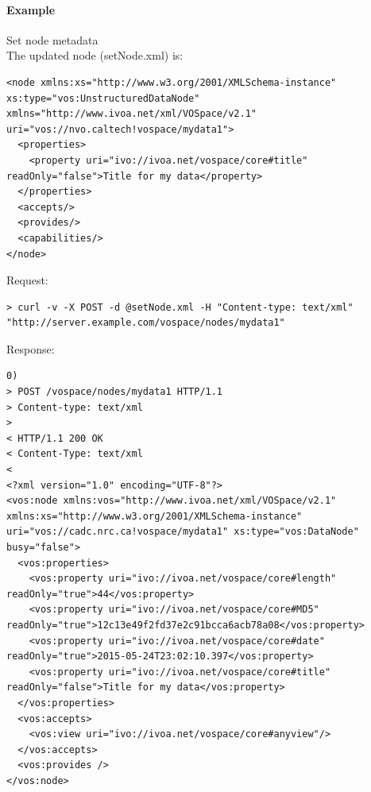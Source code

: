 \documentclass[11pt,a4paper]{ivoa}
\begin{document}
\paragraph{Example}
Set node metadata
\\[5px]
\noindent
The updated node (setNode.xml) is:
\begin{lstlisting}
<node xmlns:xs="http://www.w3.org/2001/XMLSchema-instance" xs:type="vos:UnstructuredDataNode" xmlns="http://www.ivoa.net/xml/VOSpace/v2.1" uri="vos://nvo.caltech!vospace/mydata1">
  <properties>
    <property uri="ivo://ivoa.net/vospace/core#title" readOnly="false">Title for my data</property>
  </properties>
  <accepts/>
  <provides/>
  <capabilities/>
</node>
\end{lstlisting}
Request:
\begin{lstlisting}
> curl -v -X POST -d @setNode.xml -H "Content-type: text/xml" "http://server.example.com/vospace/nodes/mydata1"
\end{lstlisting}
Response:
\begin{lstlisting}0)
> POST /vospace/nodes/mydata1 HTTP/1.1
> Content-type: text/xml
>
< HTTP/1.1 200 OK
< Content-Type: text/xml
<
<?xml version="1.0" encoding="UTF-8"?>
<vos:node xmlns:vos="http://www.ivoa.net/xml/VOSpace/v2.1" xmlns:xs="http://www.w3.org/2001/XMLSchema-instance" uri="vos://cadc.nrc.ca!vospace/mydata1" xs:type="vos:DataNode" busy="false">
  <vos:properties>
    <vos:property uri="ivo://ivoa.net/vospace/core#length" readOnly="true">44</vos:property>
    <vos:property uri="ivo://ivoa.net/vospace/core#MD5" readOnly="true">12c13e49f2fd37e2c91bcca6acb78a08</vos:property>
    <vos:property uri="ivo://ivoa.net/vospace/core#date" readOnly="true">2015-05-24T23:02:10.397</vos:property>
    <vos:property uri="ivo://ivoa.net/vospace/core#title" readOnly="false">Title for my data</vos:property>
  </vos:properties>
  <vos:accepts>
    <vos:view uri="ivo://ivoa.net/vospace/core#anyview"/>
  </vos:accepts>
  <vos:provides />
</vos:node>
\end{lstlisting}
\end{document}
